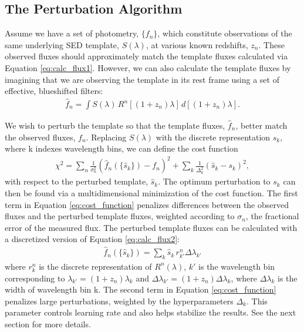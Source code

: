 \subsection{The Perturbation Algorithm}
\label{sect:perturbation}

Assume we have a set of photometry, $\{f_n\}$, which constitute observations of the same underlying SED template, $S(\lambda)$, at various known redshifts, $z_n$. 
These observed fluxes should approximately match the template fluxes calculated via Equation \ref{eq:calc_flux1}. 
However, we can also calculate the template fluxes by imagining that we are observing the template in its rest frame using a set of effective, blueshifted filters:
\begin{align}
    \hat{f}_n = \int S(\lambda) \, R^n[(1+z_n)\lambda] \, d[(1+z_n)\lambda]. \label{eq:calc_flux2}
\end{align}

We wish to perturb the template so that the template fluxes, $\hat{f}_n$, better match the observed fluxes, $f_n$. 
Replacing $S(\lambda)$ with the discrete representation $s_k$, where k indexes wavelength bins, we can define the cost function
\begin{align}
    \chi^2 =
    \sum_n \frac{1}{\sigma_n^2}(\hat{f}_n(\{\hat{s}_k\}) - f_n)^2 + 
    \sum_k \frac{1}{\Delta_k^2}(\hat{s}_k - s_k)^2, \label{eq:cost_function}
\end{align}
with respect to the perturbed template, $\hat{s}_k$. 
The optimum perturbation to $s_k$ can then be found via a multidimensional minimization of the cost function. 
The first term in Equation \ref{eq:cost_function} penalizes differences between the observed fluxes and the perturbed template fluxes, weighted according to $\sigma_n$, the fractional error of the measured flux. 
The perturbed template fluxes can be calculated with a discretized version of Equation \ref{eq:calc_flux2}:
\begin{align}
    \hat{f}_n(\{\hat{s}_k\}) = \sum_k \hat{s}_k \, r_{k'}^n \Delta\lambda_{k'}
\end{align}
where $r_k^n$ is the discrete representation of $R^n(\lambda)$, $k'$ is the wavelength bin corresponding to $\lambda_{k'} = (1+z_n) \lambda_k$ and $\Delta\lambda_{k'} = (1+z_n)\Delta\lambda_k$, where $\Delta\lambda_k$ is the width of wavelength bin k. 
The second term in Equation \ref{eq:cost_function} penalizes large perturbations, weighted by the hyperparameters $\Delta_k$. 
This parameter controls learning rate and also helps stabilize the results. 
See the next section for more details. 

